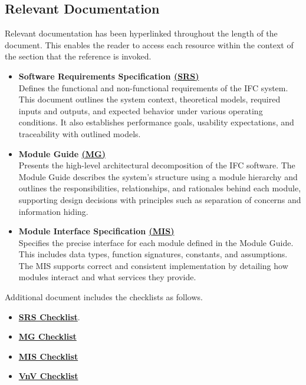 \documentclass[12pt, titlepage]{article}
\begin{document}
\subsection{Relevant Documentation}
Relevant documentation has been hyperlinked throughout the length of the document. This enables 
the reader to access each resource within the context of the section that the reference is invoked.
\begin{itemize}

  \item \textbf{Software Requirements Specification \href{https://github.com/KiranSingh15/CAS-741-Image-Correspondences/blob/main/docs/SRS/SRS.pdf}{(SRS)}}\\
  Defines the functional and non-functional requirements of the IFC system. This document outlines the system context, theoretical models, required inputs and outputs, and expected behavior under various operating conditions. It also establishes performance goals, usability expectations, and traceability with outlined models.
  
  \item \textbf{Module Guide \href{https://github.com/KiranSingh15/CAS-741-Image-Correspondences/blob/main/docs/Design/SoftArchitecture/MG.pdf}{(MG)}}\\
  Presents the high-level architectural decomposition of the IFC software. The Module Guide describes the system's structure using a module hierarchy and outlines the responsibilities, relationships, and rationales behind each module, supporting design decisions with principles such as separation of concerns and information hiding.
  
  \item \textbf{Module Interface Specification \href{https://github.com/KiranSingh15/CAS-741-Image-Correspondences/blob/main/docs/Design/SoftDetailedDes/MIS.pdf}{(MIS)}}\\
  Specifies the precise interface for each module defined in the Module Guide. This includes data types, function signatures, constants, and assumptions. The MIS supports correct and consistent implementation by detailing how modules interact and what services they provide.
  
  \end{itemize}

Additional document includes the checklists as follows.
\begin{itemize}
\item \textbf{\href{https://github.com/KiranSingh15/CAS-741-Image-Correspondences/blob/
main/docs/Checklists/SRS-Checklist.pdf}
{SRS Checklist}}. 
\item \textbf{\href{https://github.com/KiranSingh15/CAS-741-Image-Correspondences/blob/main/docs/Checklists/MG-Checklist.pdf}
{MG Checklist}} 
\item \textbf{\href{https://github.com/KiranSingh15/CAS-741-Image-Correspondences/blob/main/docs/Checklists/MIS-Checklist.pdf}{MIS Checklist}}
\item \textbf{\href{https://github.com/KiranSingh15/CAS-741-Image-Correspondences/blob/main/docs/Checklists/VnV-Checklist.pdf}
{VnV Checklist}}
\end{itemize}
\end{document}
